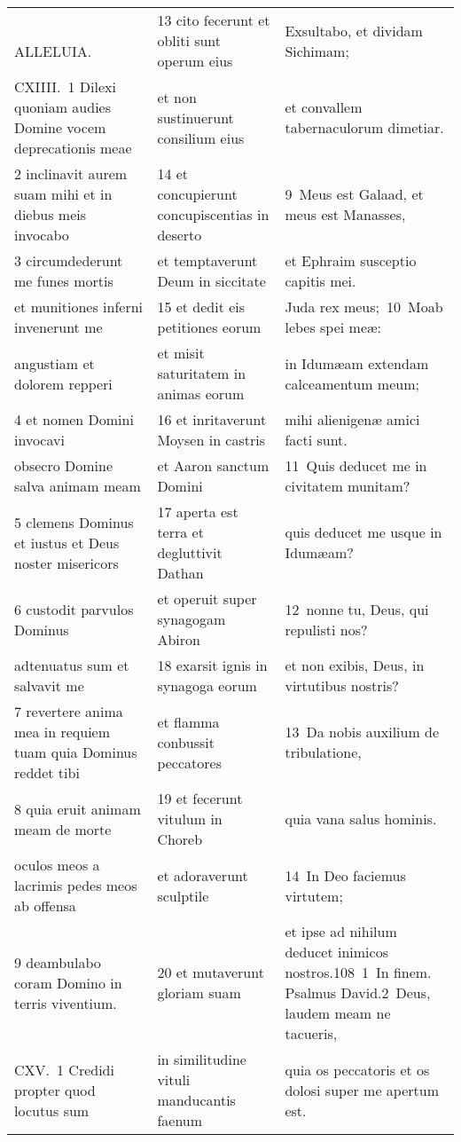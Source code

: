 \documentclass{article}
\begin{document}
\begin{longtable}{@{}p{}p{}p{}@{}}
    ALLELUIA.	&	13 cito fecerunt et obliti sunt operum eius	&	Exsultabo, et dividam Sichimam;	\\
CXIIII. 1 Dilexi quoniam audies Domine vocem deprecationis meae	&	et non sustinuerunt consilium eius	&	et convallem tabernaculorum dimetiar.	\\
2 inclinavit aurem suam mihi et in diebus meis invocabo	&	14 et concupierunt concupiscentias in deserto	&	9 Meus est Galaad, et meus est Manasses,	\\
3 circumdederunt me funes mortis	&	et temptaverunt Deum in siccitate	&	et Ephraim susceptio capitis mei.	\\
et munitiones inferni invenerunt me	&	15 et dedit eis petitiones eorum	&	Juda rex meus; 10 Moab lebes spei meæ:	\\
angustiam et dolorem repperi	&	et misit saturitatem in animas eorum	&	in Idumæam extendam calceamentum meum;	\\
4 et nomen Domini invocavi	&	16 et inritaverunt Moysen in castris	&	mihi alienigenæ amici facti sunt.	\\
obsecro Domine salva animam meam	&	et Aaron sanctum Domini	&	11 Quis deducet me in civitatem munitam?	\\
5 clemens Dominus et iustus et Deus noster misericors	&	17 aperta est terra et degluttivit Dathan	&	quis deducet me usque in Idumæam?	\\
6 custodit parvulos Dominus	&	et operuit super synagogam Abiron	&	12 nonne tu, Deus, qui repulisti nos?	\\
adtenuatus sum et salvavit me	&	18 exarsit ignis in synagoga eorum	&	et non exibis, Deus, in virtutibus nostris?	\\
7 revertere anima mea in requiem tuam quia Dominus reddet tibi	&	et flamma conbussit peccatores	&	13 Da nobis auxilium de tribulatione,	\\
8 quia eruit animam meam de morte	&	19 et fecerunt vitulum in Choreb	&	quia vana salus hominis.	\\
oculos meos a lacrimis pedes meos ab offensa	&	et adoraverunt sculptile	&	14 In Deo faciemus virtutem;	\\
9 deambulabo coram Domino in terris viventium.	&	20 et mutaverunt gloriam suam	&	et ipse ad nihilum deducet inimicos nostros.108 1 In finem. Psalmus David.2 Deus, laudem meam ne tacueris,	\\
CXV. 1 Credidi propter quod locutus sum	&	in similitudine vituli manducantis faenum	&	quia os peccatoris et os dolosi super me apertum est.	\\

\end{longtable}
\end{document}
